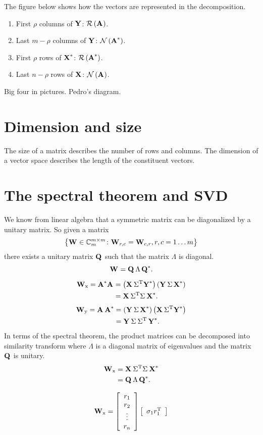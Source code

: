 The figure below shows how the vectors are represented in the decomposition.
\begin{enumerate}
\item First $\rho$ columns of $\Y{}$: $\rng{\A{}}$.
\item Last $m-\rho$ columns of $\Y{}$: $\nll{\A{*}}$.
\item First $\rho$ rows of $\X{*}$: $\rng{\A{*}}$.
\item Last $n-\rho$ rows of $\X{}$: $\nll{\A{}}$.
\end{enumerate}

Big four in pictures. Pedro's diagram.


\section{Dimension and size}
The size of a matrix describes the number of rows and columns. The dimension of  a vector space describes the length of the constituent vectors.

\section{The spectral theorem and SVD}
We know from linear algebra that a symmetric matrix can be diagonalized by a unitary matrix. So given a matrix
\begin{equation}
  \lst{\W{} \in \cmplx{\bys{m}}_{m}\colon\mathbf{W}_{r,c}=\mathbf{W}_{c,r}, r,c=1\dots m}
\end{equation}
there exists a unitary matrix $\Q{}$ such that the matrix $\Lambda$ is diagonal.
\begin{equation}
  \W{} = \Q{}\,\Lambda\,\Q{*}.
\end{equation}

\begin{equation}
  \begin{split}
    \W{x} = \prdm{*} &= \paren{\X{}\,\sig{T}\Y{*}}\paren{\svd{*}} \\
    &= \X{}\,\sig{T}\sig{}\,\X{*}.
  \end{split}
\end{equation}
\begin{equation}
  \begin{split}
    \W{y} = \prdmm{*} &= \paren{\svd{*}}\paren{\X{}\,\sig{T}\Y{*}}\\
    & = \Y{}\,\sig{}\,\sig{T}\,\Y{*}.
  \end{split}
\end{equation}In terms of the spectral theorem, the product matrices can be decomposed into similarity transform where $\Lambda$ is a diagonal matrix of eigenvalues and the matrix $\Q{}$ is unitary.
\begin{equation}
  \begin{split}
    \W{x} &= \X{}\,\sig{T} \sig{}\,\X{*}\\
          &= \Q{}\,\Lambda\,\Q{*}.
  \end{split}
\end{equation}

\begin{equation}
  \W{x} = \mat{c}{r_{1}\\r_{2}\\\vdots\\r_{n}} \mat{c}{\sigma_{1}r_{1}^{\mathrm{T}}}
\end{equation}


\endinput